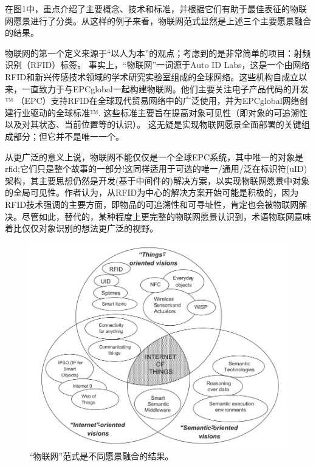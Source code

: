 \documentclass[12pt,a4paper]{article}%
\begin{document}
在图1中，重点介绍了主要概念、技术和标准，并根据它们有助于最佳表征的物联网愿景进行了分类。从这样的例子来看，物联网范式显然是上述三个主要愿景融合的结果。

物联网的第一个定义来源于“以人为本”的观点；考虑到的是非常简单的项目：射频识别（RFID）标签。
事实上，“物联网”一词源于Auto ID Labs，这是一个由网络RFID和新兴传感技术领域的学术研究实验室组成的全球网络。这些机构自成立以来，一直致力于与EPCglobal一起构建物联网。他们主要关注电子产品代码的开发™ （EPC）支持RFID在全球现代贸易网络中的广泛使用，并为EPCglobal网络创建行业驱动的全球标准™. 这些标准主要旨在提高对象可见性（即对象的可追溯性以及对其状态、当前位置等的认识）。
这无疑是实现物联网愿景全面部署的关键组成部分；但它并不是唯一一个。

从更广泛的意义上说，物联网不能仅仅是一个全球EPC系统，其中唯一的对象是rfid;它们只是整个故事的一部分!这同样适用于可选的唯一/通用/泛在标识符(uID)架构，其主要思想仍然是开发(基于中间件的)解决方案，以实现物联网愿景中对象的全局可见性。作者认为，从RFID为中心的解决方案开始可能是积极的，因为RFID技术强调的主要方面，即物品的可追溯性和可寻址性，肯定也会被物联网解决。尽管如此，替代的，某种程度上更完整的物联网愿景认识到，术语物联网意味着比仅仅对象识别的想法更广泛的视野。

\begin{figure}[H]%
	\centering
	\begin{minipage}{0.83\textwidth}%
		\centering
		\includegraphics[width=1.0%
		\textwidth]{fig1.jpg}%
		\caption{\fontsize{10pt}{15pt}\selectfont “物联网”范式是不同愿景融合的结果。}%
	\end{minipage}
\end{figure}
\end{document}

